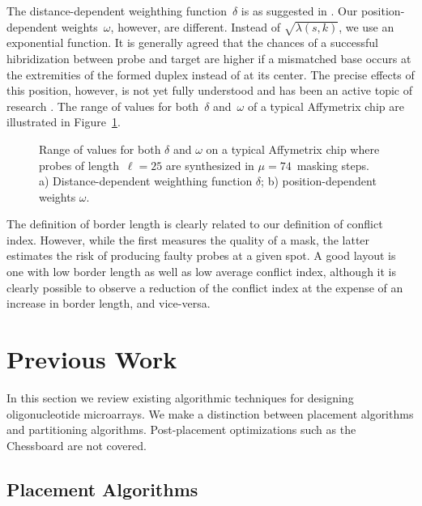 \documentclass{bioinfo}
\begin{document}
The distance-dependent weighthing function~$\delta$ is as suggested in \citealp{KAHNG03A}. Our position-dependent weights~$\omega$, however, are different. Instead of $\sqrt{\lambda(s,k)}$, we use an exponential function. It is generally agreed that the chances of a successful hibridization between probe and target are higher if a mismatched base occurs at the extremities of the formed duplex instead of at its center. The precise effects of this position, however, is not yet fully understood and has been an active topic of research \citep{BINDER05}. The range of values for both~$\delta$ and~$\omega$ of a typical Affymetrix chip are illustrated in Figure~\ref{fig:conflit_index_values}.

\begin{figure}
\caption{Range of values for both $\delta$ and $\omega$ on a typical Affymetrix chip where probes of length~$\ell = 25$ are synthesized in $\mu = 74$~masking steps. a) Distance-dependent weighthing function $\delta$; b) position-dependent weights $\omega$.}
\label{fig:conflit_index_values}
\end{figure}

The definition of border length is clearly related to our definition of conflict index. However, while the first measures the quality of a mask, the latter estimates the risk of producing faulty probes at a given spot. A good layout is one with low border length as well as low average conflict index, although it is clearly possible to observe a reduction of the conflict index at the expense of an increase in border length, and vice-versa.

\section{Previous Work}
\label{sec:previous_work}

In this section we review existing algorithmic techniques for designing oligonucleotide microarrays. We make a distinction between placement algorithms and partitioning algorithms. Post-placement optimizations such as the Chessboard \citep{KAHNG02} are not covered.

\subsection{Placement Algorithms}
\label{sec:placement_alg}
\end{document}
